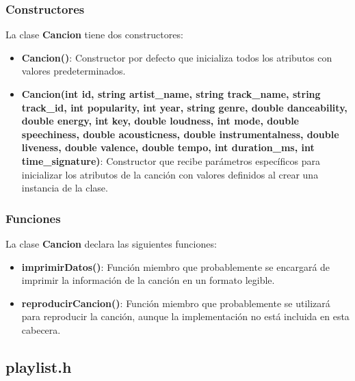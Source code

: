 \documentclass[corference]{IEEEtran}
\begin{document}
\begin{flushleft}
            \subsubsection{Constructores}
            
                \noindent\hspace*{4em}La clase \textbf{Cancion} tiene dos constructores:
                
                \begin{itemize}[left=4em]
                    \item \textbf{Cancion()}: Constructor por defecto que inicializa todos los atributos con valores predeterminados. 
                    \item \textbf{Cancion(int id, string artist\_name, string track\_name, string track\_id, int popularity, int year, string genre, double danceability, double energy, int key, double loudness, int mode, double speechiness, double acousticness, double instrumentalness, double liveness, double valence, double tempo, int duration\_ms, int time\_signature)}: Constructor que recibe parámetros específicos para inicializar los atributos de la canción con valores definidos al crear una instancia de la clase.
                \end{itemize}
            
            \subsubsection{Funciones}
            
                \noindent\hspace*{4em}La clase \textbf{Cancion} declara las siguientes funciones:
                
                \begin{itemize}[left=4em]
                    \item \textbf{imprimirDatos()}: Función miembro que probablemente se encargará de imprimir la información de la canción en un formato legible.
                    \item \textbf{reproducirCancion()}: Función miembro que probablemente se utilizará para reproducir la canción, aunque la implementación no está incluida en esta cabecera.
                \end{itemize}

            \subsection{playlist.h}


\end{flushleft}
\end{document}
